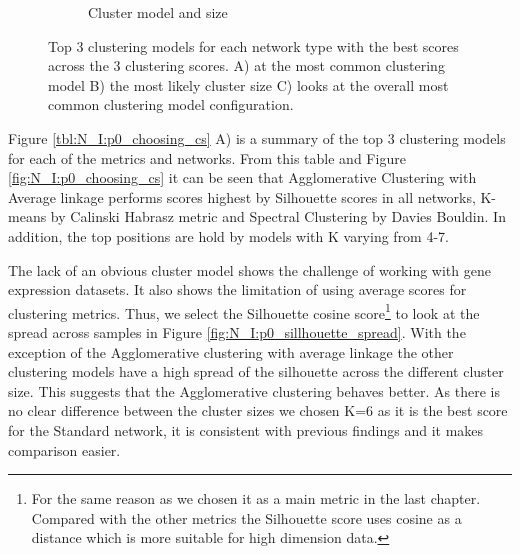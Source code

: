 \begin{figure}[!htb]
\begin{subfigure}[b]{0.47\textwidth}
        \caption{Cluster model and size}
    \end{subfigure}
    \hfill
    \caption{Top 3 clustering models for each network type with the best scores across the 3 clustering scores. A) at the most common clustering model B) the most likely cluster size C) looks at the overall most common clustering model configuration.}
    \label{fig:N_I:p0_top_3_metrics}
\end{figure}


Figure \ref{tbl:N_I:p0_choosing_cs} A) is a summary of the top 3 clustering models for each of the metrics and networks. From this table and Figure \ref{fig:N_I:p0_choosing_cs} it can be seen that Agglomerative Clustering with Average linkage performs scores highest by Silhouette scores in all networks, K-means by Calinski Habrasz metric and Spectral Clustering by Davies Bouldin. In addition, the top positions are hold by models with K varying from 4-7. 



The lack of an obvious cluster model shows the challenge of working with gene expression datasets. It also shows the limitation of using average scores for clustering metrics. Thus, we select the Silhouette cosine score\footnote{For the same reason as we chosen it as a main metric in the last chapter. Compared with the other metrics the Silhouette score uses cosine as a distance which is more suitable for high dimension data.} to look at the spread across samples in Figure \ref{fig:N_I:p0_sillhouette_spread}. With the exception of the Agglomerative clustering with average linkage the other clustering models have a high spread of the silhouette across the different cluster size. This suggests that the Agglomerative clustering behaves better. As there is no clear difference between the cluster sizes we chosen K=6 as it is the best score for the Standard network, it is consistent with previous findings and it makes comparison easier.

